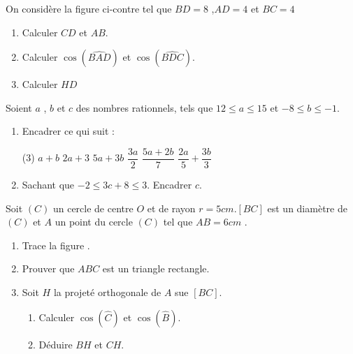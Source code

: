 \documentclass[a4paper,12pt]{article}
\begin{document}
\devoir[sem=2,prv=true,ds=false,num=5 ,niv=2 ,date=17/04/2023,Rdate=24/04/2023]

\begin{exo}
\begin{minipage}{.6\linewidth}
On considère la figure ci-contre tel que $BD=8$ ,$AD=4$ et $BC=4$
\begin{enumerate}
\item Calculer $CD$ et $AB$.
\item Calculer $\cos(\widehat{BAD})$ et $\cos(\widehat{BDC})$.
\item Calculer $HD$
\end{enumerate}
\end{minipage}
\begin{minipage}{.4\linewidth}
\end{minipage}
\end{exo}


\begin{exo}
Soient $a$ , $b$ et $c$ des nombres rationnels, tels que $12\leq a \leq15$ et $-8\leq b \leq -1$.
\begin{enumerate}
\item Encadrer ce qui suit :
\begin{tasks}[style=itemize](3)
\task $a+b$
\task $2a+3$
\task $5a+3b$
\task $\dfrac{3a}{2}$
\task $\dfrac{5a+2b}{7}$
\task $\dfrac{2a}{5}+\dfrac{3b}{3}$
\end{tasks}
\item Sachant que  $-2 \leq 3c+8 \leq 3$. Encadrer $c$.
\end{enumerate}
\end{exo}

\begin{exo}
Soit $(C)$ un cercle de centre $O$ et de rayon $r=5cm$.$[BC]$ est un diamètre de $(C)$ et $A$ un point du cercle $(C)$ tel que $AB=6cm$ .
\begin{enumerate}
\item Trace la figure .
\item Prouver que $ABC$ est un triangle rectangle.
\item Soit $H$ la projeté orthogonale de $A$ sue $[BC]$.
\begin{enumerate}
\item Calculer $\cos(\widehat{C})$ et  $\cos(\widehat{B})$.
\item Déduire $BH$ et $CH$.
\end{enumerate}
\end{enumerate}
\end{exo}
\end{document}
